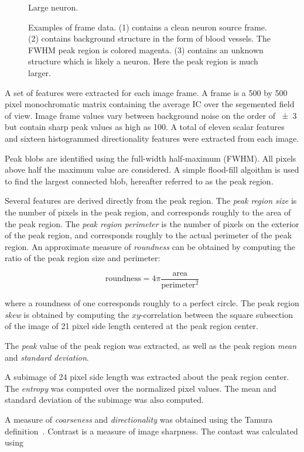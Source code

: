 \documentclass[11pt]{article}
\begin{document}
\begin{figure}[h]
\begin{minipage}{.33\textwidth}
      \caption{\footnotesize Large neuron. }
      \label{fig:test2}
    \end{minipage}
    \caption{Examples of frame data. (1) contains a clean neuron source frame. (2) contains background structure in the form of blood vessels. The FWHM peak region is colored magenta. (3) contains an unknown structure which is likely a neuron. Here the peak region is much larger. }
\end{figure}

A set of features were extracted for each image frame.
A frame is a \num{500} by \num{500} pixel monochromatic matrix containing the average IC over the segemented field of view. 
Image frame values vary between background noise on the order of \num{+-3} but contain sharp peak values as high as \num{100}.
A total of eleven scalar features and sixteen histogrammed directionality features were extracted from each image.

Peak blobs are identified using the full-width half-maximum (FWHM). 
All pixels above half the maximum value are considered.
A simple flood-fill algoithm is used to find the largest connected blob, hereafter referred to as the peak region.

Several features are derived directly from the peak region.
The \emph{peak region size} is the number of pixels in the peak region, and corresponds roughly to the area of the peak region.
The \emph{peak region perimeter} is the number of pixels on the exterior of the peak region, and corresponds roughly to the actual perimeter of the peak region. 
An approximate measure of \emph{roundness} can be obtained by computing the ratio of the peak region size and perimeter:

$$
\text{roundness} = 4\pi \frac{\text{area}}{\text{perimeter}^2}
$$

\noindent
where a roundness of one corresponds roughly to a perfect circle.
The peak region \emph{skew} is obtained by computing the $xy$-correlation between the square subsection of the image of \num{21} pixel side length centered at the peak region center.

The \emph{peak} value of the peak region was extracted, as well as the peak region \emph{mean} and \emph{standard deviation}.

A subimage of \num{24} pixel side length was extracted about the peak region center.
The \emph{entropy} was computed over the normalized pixel values.
The mean and standard deviation of the subimage was also computed.

A measure of \emph{coarseness} and \emph{directionality} was obtained using the Tamura definition~\cite{Tamura1978}.
Contrast is a measure of image sharpness. 
The contast was calculated using
\end{document}
